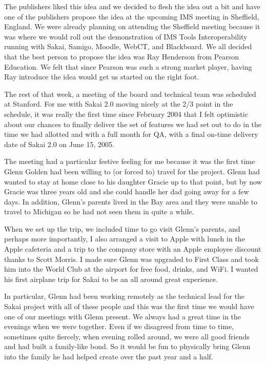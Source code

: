 \documentclass[12pt]{book}
\begin{document}
The publishers liked this idea and we decided to
flesh the idea out a bit and have one of the publishers
propose the idea at the upcoming IMS meeting
in Sheffield, England.  We were already planning on
attending the Sheffield meeting because it was where
we would roll out the demonstration of IMS Tools
Interoperability running with Sakai, Samigo, Moodle,
WebCT, and Blackboard.   We all decided that the
best person to propose the idea was Ray Henderson
from Pearson Education.   We felt that since Pearson
was such a strong market player, having Ray introduce
the idea would get us started on the right foot.

The rest of that week, a meeting of the board
and technical team was scheduled at Stanford.  For me
with Sakai 2.0 moving nicely at the 2/3 point in
the schedule, it was really the first time since
February 2004 that I felt optimistic about our chances
to finally deliver the set of features we had set out to
do in the time we had allotted and with a full month
for QA, with a final on-time delivery date of Sakai 2.0
on June 15, 2005.

The meeting had a particular festive feeling for me
because it was the first time Glenn Golden had been
willing to (or forced to) travel for the project.
Glenn had wanted to stay at home close to his
daughter Gracie up to that point, but by now Gracie
was three years old and she could handle her dad going
away for a few days.  In addition, Glenn's parents
lived in the Bay area and they were unable to travel
to Michigan so he had not seen them in quite a while.

When we set up the trip, we included time to go
visit Glenn's parents, and perhaps more importantly,
I also arranged a visit to Apple with lunch in the
Apple cafeteria and a trip to the company store
with an Apple employee discount thanks to Scott
Morris.  I made sure
Glenn was upgraded to First Class and took him into
the World Club at the airport for free food,
drinks, and WiFi.  I wanted his first airplane trip
for Sakai to be an all around great experience.

In particular, Glenn had been working remotely
as the technical lead for the Sakai project with
all of these people and this was the first
time we would have one of our meetings with Glenn
present.  We always had a great time in the evenings
when we were together.  Even if we disagreed from
time to time, sometimes quite fiercely, when evening
rolled around, we were all good friends and had
built a family-like bond.  So it would be fun
to physically bring Glenn into the family he had
helped create over the past year and a half.
\end{document}
